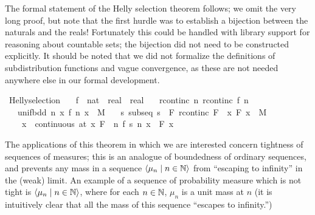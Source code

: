 \documentclass{article}
\theoremstyle{definition}
\newcommand{\bldseq}[2]{\langle{#1}\mid{#2}\rangle}
\begin{document}
The formal statement of the Helly selection theorem follows; we omit the very long proof, but note that the first hurdle was to establish a bijection between the naturals and the reals! Fortunately this could be handled with library support for reasoning about countable sets; the bijection did not need to be constructed explicitly. It should be noted that we did not formalize the definitions of subdistribution functions and vague convergence, as these are not needed anywhere else in our formal development.

\medskip

\begin{isabellebody}
\isamarkupfalse%
\ Helly{\isacharunderscore}selection{\isacharcolon}\isanewline
\ \ \ f\ {\isacharcolon}{\isacharcolon}\ {\isachardoublequoteopen}nat\ {\isasymRightarrow}\ real\ {\isasymRightarrow}\ real{\isachardoublequoteclose}\isanewline
\ \ \ rcont{\isacharunderscore}inc{\isacharcolon}\ {\isachardoublequoteopen}{\isasymAnd}n{\isachardot}\ rcont{\isacharunderscore}inc\ {\isacharparenleft}f\ n{\isacharparenright}{\isachardoublequoteclose}\isanewline
\ \ \ unif{\isacharunderscore}bdd{\isacharcolon}\ {\isachardoublequoteopen}{\isasymforall}n\ x{\isachardot}\ {\isasymbar}f\ n\ x{\isasymbar}\ {\isasymle}\ M{\isachardoublequoteclose}\isanewline
\ \ \ {\isachardoublequoteopen}{\isasymexists}s{\isachardot}\ subseq\ s\ {\isasymand}\ {\isacharparenleft}{\isasymexists}F{\isachardot}\ rcont{\isacharunderscore}inc\ F\ {\isasymand}\ {\isacharparenleft}{\isasymforall}x{\isachardot}\ {\isasymbar}F\ x{\isasymbar}\ {\isasymle}\ M{\isacharparenright}\ {\isasymand}\isanewline
\ \ \ \ {\isacharparenleft}{\isasymforall}x{\isachardot}\ \ continuous\ {\isacharparenleft}at\ x{\isacharparenright}\ F\ {\isasymlongrightarrow}\ {\isacharparenleft}{\isasymlambda}n{\isachardot}\ f\ {\isacharparenleft}s\ n{\isacharparenright}\ x{\isacharparenright}\ {\isacharminus}{\isacharminus}{\isacharminus}{\isacharminus}{\isachargreater}\ F\ x{\isacharparenright}{\isacharparenright}{\isachardoublequoteclose}
\end{isabellebody}

\medskip

The applications of this theorem in which we are interested concern tightness of sequences of measures; this is an analogue of boundedness of ordinary sequences, and prevents any mass in a sequence $\bldseq{\mu_n}{n \in \N}$ from ``escaping to infinity'' in the (weak) limit. An example of a sequence of probability measure which is not tight is $\bldseq{\mu_n}{n \in \N}$, where for each $n \in \mathbb{N}$, $\mu_n$ is a unit mass at $n$ (it is intuitively clear that all the mass of this sequence ``escapes to infinity.'')
\end{document}
